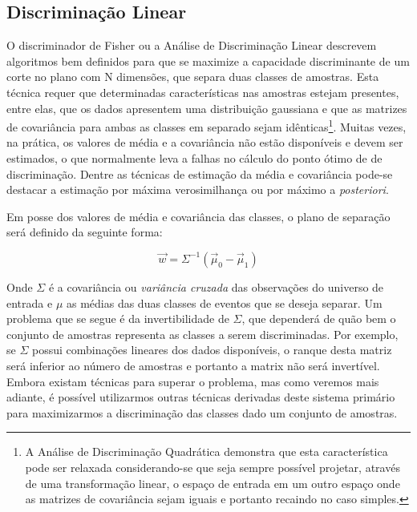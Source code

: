 
\subsection{Discriminação Linear}

O discriminador de Fisher \cite{fisher} ou a Análise de Discriminação Linear
\cite{duda} descrevem algoritmos bem definidos para que se maximize a
capacidade discriminante de um corte no plano com N dimensões, que separa duas
classes de amostras. Esta técnica requer que determinadas características nas
amostras estejam presentes, entre elas, que os dados apresentem uma
distribuição gaussiana e que as matrizes de covariância para ambas as classes
em separado sejam idênticas\footnote{A Análise de Discriminação Quadrática
\cite{duda} demonstra que esta característica pode ser relaxada
considerando-se que seja sempre possível projetar, através de uma
transformação linear, o espaço de entrada em um outro espaço onde as matrizes
de covariância sejam iguais e portanto recaindo no caso simples.}. Muitas
vezes, na prática, os valores de média e a covariância não estão disponíveis e
devem ser estimados, o que normalmente leva a falhas no cálculo do ponto ótimo
de de discriminação. Dentre as técnicas de estimação da média e covariância
pode-se destacar a estimação por máxima verosimilhança ou por máximo a
\textit{posteriori}.

Em posse dos valores de média e covariância das classes, o plano de separação
será definido da seguinte forma:

\begin{equation}
\overrightarrow{w} = \Sigma^{-1}(\overrightarrow{\mu}_0 -
\overrightarrow{\mu}_1) 
\end{equation}

Onde $\Sigma$ é a covariância ou \textit{variância cruzada} das observações do
universo de entrada e $\mu$ as médias das duas classes de eventos que se
deseja separar. Um problema que se segue é da invertibilidade de $\Sigma$, que
dependerá de quão bem o conjunto de amostras representa as classes a serem
discriminadas. Por exemplo, se $\Sigma$ possui combinações lineares dos dados
disponíveis, o ranque desta matriz será inferior ao número de amostras e
portanto a matrix não será invertível. Embora existam técnicas para superar o
problema, mas como veremos mais adiante, é possível utilizarmos outras
técnicas derivadas deste sistema primário para maximizarmos a discriminação
das classes dado um conjunto de amostras.

